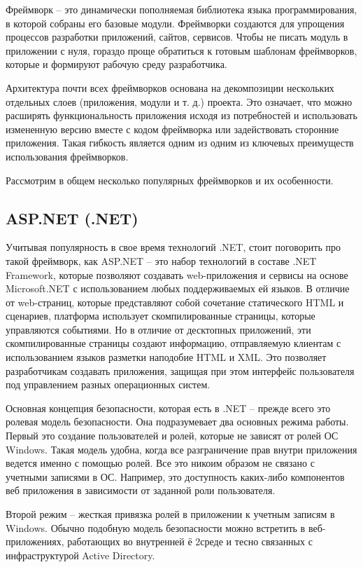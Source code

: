 Фреймворк -- это динамически пополняемая библиотека языка программирования, в 
которой собраны его базовые модули. Фреймворки создаются для упрощения процессов разработки приложений, сайтов, сервисов.
Чтобы не писать модуль в приложении с нуля, гораздо проще обратиться к готовым шаблонам фреймворков, которые и формируют 
рабочую среду разработчика.

Архитектура почти всех фреймворков основана на декомпозиции нескольких отдельных слоев (приложения, модули и т. д.) проекта.
Это означает, что можно расширять функциональность приложения исходя из потребностей и использовать измененную версию вместе 
с кодом фреймворка или задействовать сторонние приложения. Такая гибкость является одним из одним из ключевых преимуществ 
использования фреймворков.

Рассмотрим в общем несколько популярных фреймворков и их особенности.

\subsection{ASP.NET (.NET)}
 
Учитывая популярность в свое время технологий .NET, стоит поговорить про такой фреймворк, как ASP.NET -- это набор технологий 
в составе .NET Framework, которые позволяют создавать
web-приложения и сервисы на основе Microsoft.NET с использованием любых поддерживаемых ей языков. В отличие от 
web-страниц, которые представляют собой сочетание статического HTML
и сценариев, платформа использует скомпилированные страницы, которые управляются событиями. Но в отличие от десктопных приложений, эти 
скомпилированные страницы создают информацию, отправляемую клиентам с использованием языков
разметки наподобие HTML и XML. Это позволяет разработчикам создавать приложения, защищая
при этом интерфейс пользователя под управлением разных операционных систем.

Основная концепция безопасности, которая есть в .NET -- прежде всего это ролевая модель безопасности. Она подразумевает 
два основных режима работы. Первый это создание пользователей и ролей, которые не 
зависят от ролей ОС Windows. Такая модель удобна, когда все разграничение прав внутри приложения ведется именно с помощью
ролей. Все это никоим образом не связано с учетными записями в ОС. Например, это доступность
каких-либо компонентов веб приложения в зависимости от заданной роли пользователя.

Второй режим -- жесткая привязка ролей в приложении к учетным записям в Windows. Обычно подобную модель безопасности 
можно встретить в веб-приложениях, работающих во внутренней ё 2среде и тесно связанных с инфраструктурой Active Directory.

